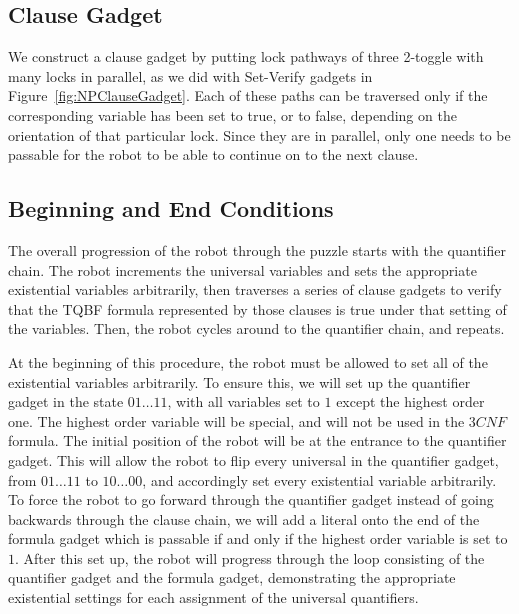 
\subsection{Clause Gadget}
We construct a clause gadget by putting lock pathways of three 2-toggle with many locks in parallel, as we did with Set-Verify gadgets in Figure~\ref{fig:NPClauseGadget}. Each of these paths can be traversed only if the corresponding variable has been set to true, or to false, depending on the orientation of that particular lock. Since they are in parallel, only one needs to be passable for the robot to be able to continue on to the next clause.

\subsection{Beginning and End Conditions}
The overall progression of the robot through the puzzle starts with the quantifier chain.
The robot increments the universal variables and sets the appropriate existential variables arbitrarily, 
then traverses a series of clause gadgets to verify that the TQBF formula represented by those clauses 
is true under that setting of the variables. Then, the robot cycles around to the quantifier chain, and repeats.

At the beginning of this procedure, the robot must be allowed to set all of the existential variables arbitrarily.
To ensure this, we will set up the quantifier gadget in the state $01 \ldots 11$, with all variables set to $1$
except the highest order one.  The highest order variable will be special, and will not be used in the $3CNF$
formula. The initial position of the robot will be at the entrance to the quantifier gadget. This will allow
the robot to flip every universal in the quantifier gadget, from $01 \ldots 11$ to $10 \ldots 00$, and accordingly
set every existential variable arbitrarily. To force the robot to go forward through the quantifier gadget
instead of going backwards through the clause chain, we will add a literal onto the end of the formula gadget
which is passable if and only if the highest order variable is set to $1$.
After this set up, the robot will progress through the loop consisting of the quantifier gadget and the
formula gadget, demonstrating the appropriate existential settings for each assignment of the universal
quantifiers.

